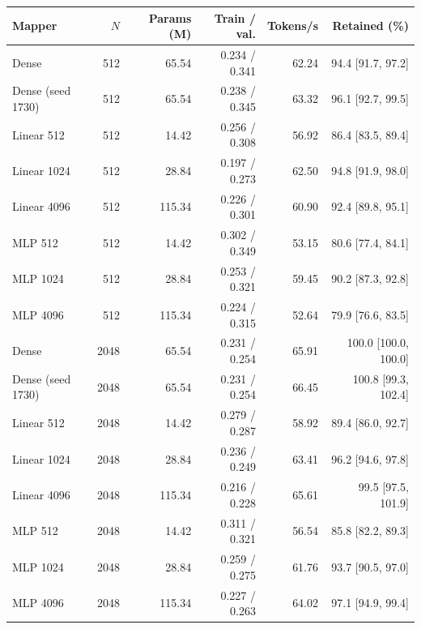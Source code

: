 \begin{tabular}{lrrrrr}
\toprule
Mapper & $N$ & Params (M) & Train / val. & Tokens/s & Retained (\%) \\
\midrule
Dense & 512 & 65.54 & 0.234 / 0.341 & 62.24 & 94.4 [91.7, 97.2] \\
Dense (seed 1730) & 512 & 65.54 & 0.238 / 0.345 & 63.32 & 96.1 [92.7, 99.5] \\
Linear 512 & 512 & 14.42 & 0.256 / 0.308 & 56.92 & 86.4 [83.5, 89.4] \\
Linear 1024 & 512 & 28.84 & 0.197 / 0.273 & 62.50 & 94.8 [91.9, 98.0] \\
Linear 4096 & 512 & 115.34 & 0.226 / 0.301 & 60.90 & 92.4 [89.8, 95.1] \\
MLP 512 & 512 & 14.42 & 0.302 / 0.349 & 53.15 & 80.6 [77.4, 84.1] \\
MLP 1024 & 512 & 28.84 & 0.253 / 0.321 & 59.45 & 90.2 [87.3, 92.8] \\
MLP 4096 & 512 & 115.34 & 0.224 / 0.315 & 52.64 & 79.9 [76.6, 83.5] \\
Dense & 2048 & 65.54 & 0.231 / 0.254 & 65.91 & 100.0 [100.0, 100.0] \\
Dense (seed 1730) & 2048 & 65.54 & 0.231 / 0.254 & 66.45 & 100.8 [99.3, 102.4] \\
Linear 512 & 2048 & 14.42 & 0.279 / 0.287 & 58.92 & 89.4 [86.0, 92.7] \\
Linear 1024 & 2048 & 28.84 & 0.236 / 0.249 & 63.41 & 96.2 [94.6, 97.8] \\
Linear 4096 & 2048 & 115.34 & 0.216 / 0.228 & 65.61 & 99.5 [97.5, 101.9] \\
MLP 512 & 2048 & 14.42 & 0.311 / 0.321 & 56.54 & 85.8 [82.2, 89.3] \\
MLP 1024 & 2048 & 28.84 & 0.259 / 0.275 & 61.76 & 93.7 [90.5, 97.0] \\
MLP 4096 & 2048 & 115.34 & 0.227 / 0.263 & 64.02 & 97.1 [94.9, 99.4] \\
\bottomrule
\end{tabular}
